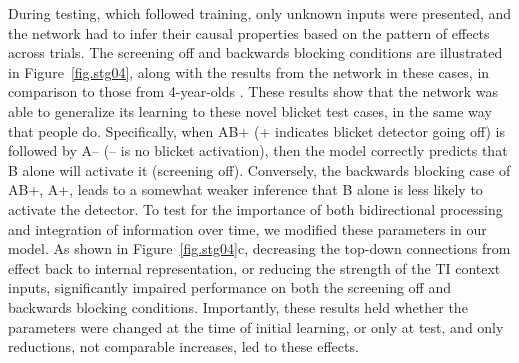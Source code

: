 \documentclass[11pt,twoside]{article}
\newif\myifpdf
\begin{document}
During testing, which followed training, only unknown inputs were presented, and the network had to infer their causal properties based on the pattern of effects across trials.  The screening off and backwards blocking conditions are illustrated in Figure~\ref{fig.stg04}, along with the results from the network in these cases, in comparison to those from 4-year-olds \cite{SobelTenenbaumGopnik04}.  These results show that the network was able to generalize its learning to these novel blicket test cases, in the same way that people do.  Specifically, when AB+ (+ indicates blicket detector going off) is followed by A-- (-- is no blicket activation), then the model correctly predicts that B alone will activate it (screening off).  Conversely, the backwards blocking case of AB+, A+, leads to a somewhat weaker inference that B alone is less likely to activate the detector.  To test for the importance of both bidirectional processing and integration of information over time, we modified these parameters in our model.  As shown in Figure~\ref{fig.stg04}c, decreasing the top-down connections from effect back to internal representation, or reducing the strength of the TI context inputs, significantly impaired performance on both the screening off and backwards blocking conditions.  Importantly, these results held whether the parameters were changed at the time of initial learning, or only at test, and only reductions, not comparable increases, led to these effects.
\end{document}

